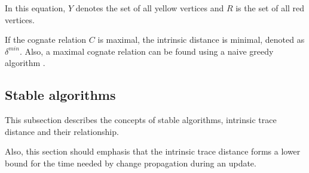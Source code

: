 In this equation, $Y$ denotes the set of all yellow vertices and $R$ is the set of all red vertices. 

If the cognate relation $C$ is maximal, the intrinsic distance is minimal, denoted as $\delta^{min}$. Also, a maximal cognate relation can be found using a naive greedy algorithm \cite{Acar2005thesis} \cite{acar2004dynamizing}.

\subsection{Stable algorithms}


This subsection describes the concepts of stable algorithms, intrinsic trace distance and their relationship. 

Also, this section should emphasis that the intrinsic trace distance forms a lower bound for the time needed by change propagation during an update. \cite{Acar2005thesis} 
